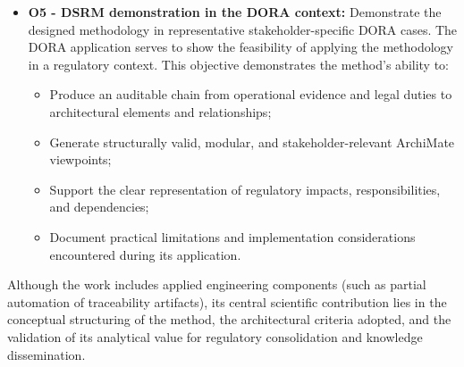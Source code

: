 \begin{itemize}
    \item \textbf{O5 - \ac{DSRM} demonstration in the \ac{DORA} context:} Demonstrate the designed methodology in representative stakeholder-specific \ac{DORA} cases. The \ac{DORA} application serves to show the feasibility of applying the methodology in a regulatory context. This objective demonstrates the method's ability to:
\begin{itemize}
    \item Produce an auditable chain from operational evidence and legal duties to architectural elements and relationships;
    \item Generate structurally valid, modular, and stakeholder-relevant ArchiMate viewpoints;
    \item Support the clear representation of regulatory impacts, responsibilities, and dependencies;
    \item Document practical limitations and implementation considerations encountered during its application.
\end{itemize}
    

\end{itemize}

Although the work includes applied engineering components (such as partial automation of traceability artifacts), its central scientific contribution lies in the conceptual structuring of the method, the architectural criteria adopted, and the validation of its analytical value for regulatory consolidation and knowledge dissemination.
\fi
